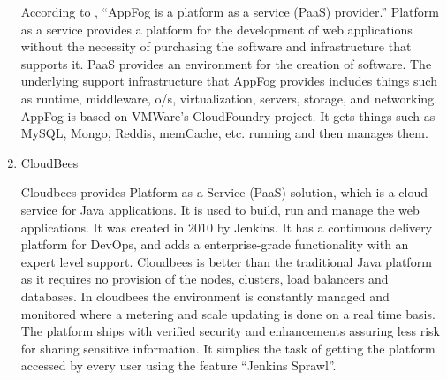 \begin{enumerate}
According to \label{\detokenize{i524/technologies:id190}}{\hyperref[\detokenize{i524/technologies:wee}]{\sphinxcrossref{{[}164{]}}}}, “AppFog is a platform as a service (PaaS)
provider.” Platform as a service provides a platform for the
development of web applications without the necessity of
purchasing the software and infrastructure that supports
it. \label{\detokenize{i524/technologies:id191}}{\hyperref[\detokenize{i524/technologies:kepes}]{\sphinxcrossref{{[}165{]}}}} PaaS provides an environment for the creation of
software. \label{\detokenize{i524/technologies:id192}}{\hyperref[\detokenize{i524/technologies:kepes}]{\sphinxcrossref{{[}165{]}}}} The underlying support infrastructure that AppFog
provides includes things such as runtime, middleware, o/s,
virtualization, servers, storage, and networking. \label{\detokenize{i524/technologies:id193}}{\hyperref[\detokenize{i524/technologies:appfog}]{\sphinxcrossref{{[}166{]}}}} AppFog
is based on VMWare’s CloudFoundry project. \label{\detokenize{i524/technologies:id194}}{\hyperref[\detokenize{i524/technologies:wee}]{\sphinxcrossref{{[}164{]}}}} It gets things
such as MySQL, Mongo, Reddis, memCache, etc. running and then
manages them. \label{\detokenize{i524/technologies:id195}}{\hyperref[\detokenize{i524/technologies:tweney}]{\sphinxcrossref{{[}167{]}}}}

\item {} 
CloudBees

\label{\detokenize{i524/technologies:id196}}{\hyperref[\detokenize{i524/technologies:www-cloudbees-wiki}]{\sphinxcrossref{{[}168{]}}}} Cloudbees provides Platform as a
Service (PaaS) solution, which is a cloud service for Java
applications. It is used to build, run and manage the web
applications. It was created in 2010 by Jenkins. It has a
continuous delivery platform for DevOps, and adds a
enterprise-grade functionality with an expert level
support. Cloudbees is better than the traditional Java platform as
it requires no provision of the nodes, clusters, load balancers
and databases. In cloudbees the environment is constantly managed
and monitored where a metering and scale updating is done on a
real time basis. \label{\detokenize{i524/technologies:id197}}{\hyperref[\detokenize{i524/technologies:www-cloudbees-webpage}]{\sphinxcrossref{{[}169{]}}}} The platform ships
with verified security and enhancements assuring less risk for
sharing sensitive information. It simplies the task of getting the
platform accessed by every user using the feature “Jenkins
Sprawl”.


\end{enumerate}
